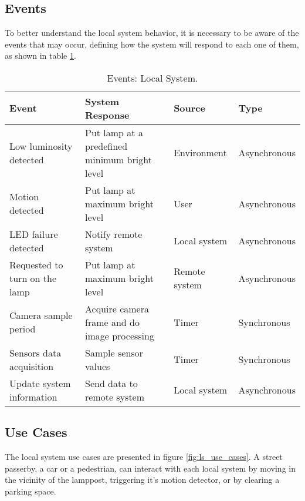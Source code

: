 \subsection{Events}
To better understand the local system behavior, it is necessary to be aware of the events that may occur, defining how the system will respond to each one of them, as shown in table \ref{table:ls_events}. 

\begin{table}[ht]
	\centering
	\resizebox{\columnwidth}{!}
	{

	\begin{tabular}{|m{3cm}|m{5cm}|m{2.4cm}|m{2.4cm}|}
		\hline
		\textbf{Event} & \textbf{System Response} & \textbf{Source} & \textbf{Type}\\
		\hline\hline
		Low luminosity detected & Put lamp at a predefined minimum bright level & Environment & Asynchronous\\
		\hline
		
		Motion detected & Put lamp at maximum bright level & User & Asynchronous\\
		\hline
		
		LED failure detected & Notify remote system & Local system & Asynchronous\\
		\hline
		
		Requested to turn on the lamp & Put lamp at maximum bright level & Remote system & Asynchronous\\
		\hline
		
		Camera sample period & Acquire camera frame and do image processing & Timer & Synchronous\\
		\hline
		
		Sensors data acquisition & Sample sensor values & Timer & Synchronous\\
		\hline
		
		Update system information & Send data to remote system & Local system & Asynchronous\\
		\hline
	\end{tabular}
	}
	\caption{Events: Local System.}
	\label{table:ls_events}
\end{table}

\clearpage
\subsection{Use Cases}
The local system use cases are presented in figure \ref{fig:ls_use_cases}. A street passerby, a car or a pedestrian, can interact with each local system by moving in the vicinity of the lamppost, triggering it's motion detector, or by clearing a parking space.

